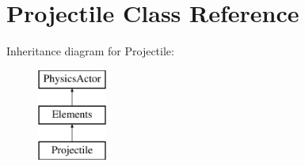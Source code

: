 \hypertarget{class_projectile}{\section{Projectile Class Reference}
\label{class_projectile}
}
Inheritance diagram for Projectile\+:\begin{figure}[H]
\begin{center}
\leavevmode
\includegraphics[height=3.000000cm]{class_projectile}
\end{center}
\end{figure}
